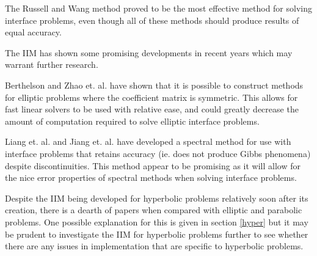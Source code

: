 The Russell and Wang method proved to be the most effective method for solving interface problems, even though all of these methods should produce results of equal accuracy.

The IIM has shown some promising developments in recent years which may warrant further research.

Berthelson \cite{berthelson04} and Zhao et. al. \cite{zhaohouli12} have shown that it is possible to construct methods for elliptic problems where the coefficient matrix is symmetric.
This allows for fast linear solvers to be used with relative ease, and could greatly decrease the amount of computation required to solve elliptic interface problems.

Liang et. al. \cite{liangetal08} and Jiang et. al. \cite{jiangetal12} have developed a spectral method for use with interface problems that retains accuracy (ie. does not produce Gibbs phenomena) despite discontinuities.
This method appear to be promising as it will allow for the nice error properties of spectral methods when solving interface problems.

Despite the IIM being developed for hyperbolic problems relatively soon after its creation, there is a dearth of papers when compared with elliptic and parabolic problems.
One possible explanation for this is given in section \ref{hyper} but it may be prudent to investigate the IIM for hyperbolic problems further to see whether there are any issues in implementation that are specific to hyperbolic problems.
